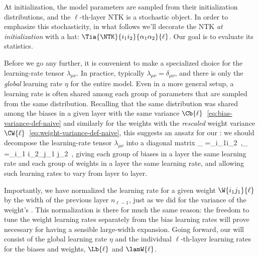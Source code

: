 At initialization, the model parameters are sampled from their initialization distributions, and the $\ell$-th-layer NTK is a stochastic object. In order to emphasize this stochasticity, in what follows we'll decorate the NTK \emph{at initialization} with a hat: $\Tia{\NTK}{i_1i_2}{\alpha_1\alpha_2}{\ell}$. Our goal is to evaluate its statistics.


Before we go any further, it is convenient to make a specialized choice for the learning-rate tensor $\lambda_{\mu\nu}$.
In practice, typically $\lambda_{\mu\nu}=\delta_{\mu\nu}$, and there is only the \emph{global} learning rate $\eta$ for the entire model. %
Even in a more general setup,
a learning rate is often shared among each group of parameters that are sampled from the same distribution. Recalling that the same distribution was shared among the biases in a given layer with the same variance $\Cb{\ell}$~\eqref{eq:bias-variance-def-naive} and similarly for the weights with the \emph{rescaled} weight variance $\CW{\ell}$~\eqref{eq:weight-variance-def-naive}, this suggests 
an ansatz
for our : we should decompose the learning-rate tensor $\lambda_{\mu\nu}$ into a diagonal matrix
\be\label{eq:diag_LR}
\lambda_{ }=\delta_{i_1i_2}\Lb{\ell}\, ,\quad \lambda_{ }=\delta_{i_1 i_2}\delta_{j_1 j_2}\lamWtil{\ell}\, ,
\ee
giving each group of biases in a layer the same learning rate and each group of weights in a layer the same learning rate, and allowing such learning rates to vary from layer to layer. 

Importantly, we have normalized the learning rate for a given weight $\W{i_1j_1}{\ell}$ by the width of the previous layer $n_{\ell-1}$, just as we did for the variance of the weight's . This normalization is there for much the same reason: the freedom to tune the weight learning rates separately from the bias learning rates will prove necessary for having a sensible large-width expansion.
Going forward, our  will consist of the global learning rate $\eta$
and the individual $\ell$-th-layer learning rates for the biases and weights, $\Lb{\ell}$ and $\lamW{\ell}$.



